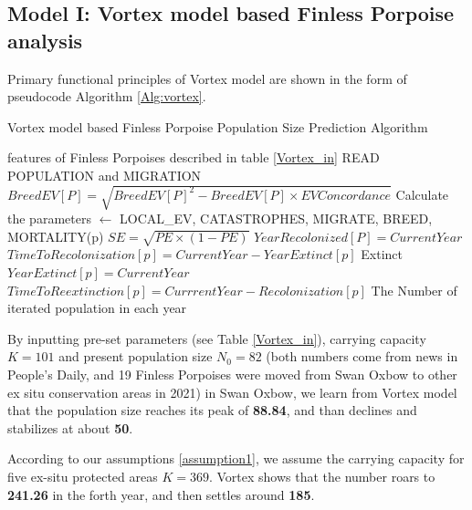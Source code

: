 \documentclass{mcmthesis}
\numberwithin{figure}{section}
\numberwithin{table}{section}
\numberwithin{equation}{section}
\begin{document}
\subsection{Model I: Vortex model based Finless Porpoise analysis}
Primary functional principles of Vortex model are shown in the form of
pseudocode Algorithm \ref{Alg:vortex}. 

\begin{algorithm}[htbp]
  \caption{Vortex model based Finless Porpoise Population Size Prediction Algorithm} %
  \label{Alg:vortex}
  \begin{algorithmic}[1]
    \Require
      features of Finless Porpoises described in table \ref{Vortex_in}
      \State READ POPULATION and MIGRATION
      \State $ BreedEV[P] = \sqrt{BreedEV[P]^2-BreedEV[P]\times EVConcordance} $
      \State Calculate the parameters $ \gets $ LOCAL\_EV, CATASTROPHES, MIGRATE, BREED, MORTALITY(p)
      \EndFor
      \State $SE = \sqrt{PE \times (1-PE)} $
      \State $ Year Recolonized[P] = Current Year $ 
      \Else \State $ TimeToRecolonization[p] = CurrentYear - YearExtinct[p]$ 
      \EndIf 
      \State Extinct
      \Else {} 
      \State $ YearExtinct[p] = CurrentYear $
      \EndIf
      \State $ TimeToReextinction[p] = CurrrentYear- Recolonization[p] $ 
      \EndIf
      \EndIf
      \EndFor
      \EndIf
      \EndFor
      \EndIf
      \EndFor
      \Ensure
      The Number of iterated population in each year
  \end{algorithmic}
\end{algorithm}

By inputting pre-set parameters (see Table \ref{Vortex_in}), 
carrying capacity $ K = 101 $ and present population size $ N_0 = 82 $
(both numbers come from news in People's Daily, and 19 Finless Porpoises were
moved from Swan Oxbow to other ex situ conservation areas in 2021) in Swan Oxbow, we learn from
Vortex model that the population size reaches its peak of \textbf{88.84}, and 
than declines and stabilizes at about \textbf{50}.
\par
According to our assumptions \ref{assumption1}, we assume the carrying capacity for five ex-situ protected areas 
$ K = 369 $. Vortex shows that the number roars to \textbf{241.26} in the forth 
year, and then settles around \textbf{185}. 
\end{document}
